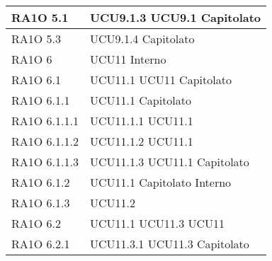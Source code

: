\begin{center}
\begin{longtable}{ | p{5cm} | p{5cm} |}
        RA1O 5.1 &  UCU9.1.3 \newline  UCU9.1 \newline  Capitolato \newline  \\ \hline      
        RA1O 5.3 &  UCU9.1.4 \newline  Capitolato \newline  \\ \hline      
        RA1O 6 &  UCU11 \newline  Interno \newline  \\ \hline      
        RA1O 6.1  &  UCU11.1 \newline  UCU11 \newline  Capitolato \newline  \\ \hline      
        RA1O 6.1.1  &  UCU11.1 \newline  Capitolato \newline  \\ \hline      
        RA1O 6.1.1.1  &  UCU11.1.1 \newline  UCU11.1 \newline  \\ \hline      
        RA1O 6.1.1.2 &  UCU11.1.2 \newline  UCU11.1 \newline  \\ \hline      
        RA1O 6.1.1.3  &  UCU11.1.3 \newline  UCU11.1 \newline  Capitolato \newline  \\ \hline      
        RA1O 6.1.2  &  UCU11.1 \newline  Capitolato \newline  Interno \newline  \\ \hline      
        RA1O 6.1.3  &  UCU11.2 \newline  \\ \hline      
        RA1O 6.2  &  UCU11.1 \newline  UCU11.3 \newline  UCU11 \newline  \\ \hline      
        RA1O 6.2.1 &  UCU11.3.1 \newline  UCU11.3 \newline  Capitolato \newline  \\ \hline      

\end{longtable}
\end{center}
